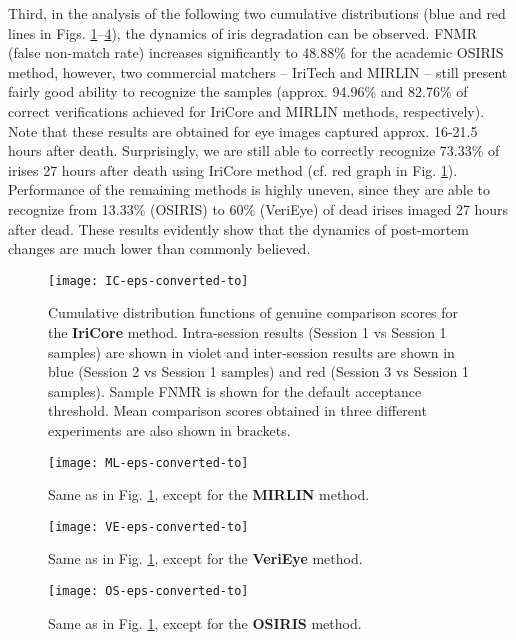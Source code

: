 \documentclass[10pt,twocolumn,letterpaper]{article}
\begin{document}
Third, in the analysis of the following two cumulative distributions (blue and red lines in Figs. \ref{fig:CDF:IC}--\ref{fig:CDF:OS}), the dynamics of iris degradation can be observed. FNMR (false non-match rate) increases significantly to 48.88\% for the academic OSIRIS method, however, two commercial matchers -- IriTech and MIRLIN -- still present fairly good ability to recognize the samples (approx. 94.96\% and 82.76\% of correct verifications achieved for IriCore and MIRLIN methods, respectively). Note that these results are obtained for eye images captured approx. 16-21.5 hours after death. Surprisingly, we are still able to correctly recognize 73.33\% of irises 27 hours after death using IriCore method (cf. red graph in Fig. \ref{fig:CDF:IC}). Performance of the remaining methods is highly uneven, since they are able to recognize from 13.33\% (OSIRIS) to 60\% (VeriEye) of dead irises imaged 27 hours after dead. These results evidently show that the dynamics of post-mortem changes are much lower than commonly believed.

\begin{figure}[!htb]
\centering
\texttt{[image: IC-eps-converted-to]}\hfill
\caption{Cumulative distribution functions of genuine comparison scores for the \textbf{IriCore} method. Intra-session results (Session 1 vs Session 1 samples) are shown in violet and inter-session results are shown in blue (Session 2 vs Session 1 samples) and red (Session 3 vs Session 1 samples). Sample FNMR is shown for the default acceptance threshold. Mean comparison scores obtained in three different experiments are also shown in brackets.}
\label{fig:CDF:IC}
\end{figure}

\begin{figure}[!htb]
\centering
\texttt{[image: ML-eps-converted-to]}\hfill
\caption{Same as in Fig. \ref{fig:CDF:IC}, except for the \textbf{MIRLIN} method.}
\label{fig:CDF:ML}
\end{figure}

\begin{figure}[!htb]
\centering
\texttt{[image: VE-eps-converted-to]}\hfill
\caption{Same as in Fig. \ref{fig:CDF:IC}, except for the \textbf{VeriEye} method.}
\label{fig:CDF:VE}
\end{figure}


\begin{figure}[!htb]
\centering
\texttt{[image: OS-eps-converted-to]}\hfill
\caption{Same as in Fig. \ref{fig:CDF:IC}, except for the \textbf{OSIRIS} method.}
\label{fig:CDF:OS}
\end{figure}
\end{document}
